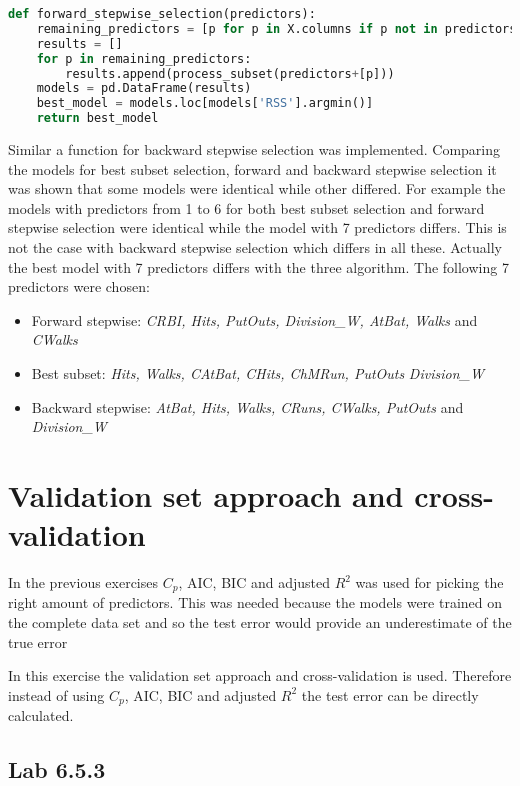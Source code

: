 \begin{lstlisting}[language=Python, label=lst:forwardselection, caption=Function for forward stepwise selection]
def forward_stepwise_selection(predictors):
	remaining_predictors = [p for p in X.columns if p not in predictors]
	results = []
	for p in remaining_predictors:
		results.append(process_subset(predictors+[p]))
	models = pd.DataFrame(results)
	best_model = models.loc[models['RSS'].argmin()]
	return best_model
\end{lstlisting}

Similar a function for backward stepwise selection was implemented. Comparing the models for best subset selection, forward and backward stepwise selection it was shown that some models were identical while other differed. For example the models with predictors from 1 to 6 for both best subset selection and forward stepwise selection were identical while the model with 7 predictors differs. This is not the case with backward stepwise selection which differs in all these. Actually the best model with 7 predictors differs with the three algorithm. The following 7 predictors were chosen:

\begin{itemize}
\item Forward stepwise: \emph{CRBI, Hits, PutOuts, Division\_W, AtBat, Walks} and \emph{CWalks}
\item Best subset: \emph{Hits, Walks, CAtBat, CHits, ChMRun, PutOuts} \emph{Division\_W}
\item Backward stepwise: \emph{AtBat, Hits, Walks, CRuns, CWalks, PutOuts} and \emph{Division\_W}
\end{itemize}

\section{Validation set approach and cross-validation}
In the previous exercises $C_p$, AIC, BIC and adjusted $R^2$ was used for picking the right amount of predictors. This was needed because the models were trained on the complete data set and so the test error would provide an underestimate of the true error

In this exercise the validation set approach and cross-validation is used. Therefore instead of using $C_p$, AIC, BIC and adjusted $R^2$ the test error can be directly calculated. 
\subsection{Lab 6.5.3}

